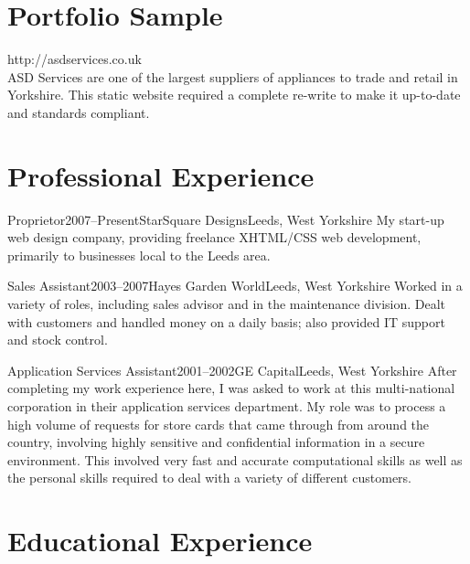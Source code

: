 \documentclass{cv}
\begin{document}
\section{Portfolio Sample}

\begin{description}[style=nextline]
\item[ASD Services] http://asdservices.co.uk\\
ASD Services are one of the largest suppliers of appliances to trade and retail in Yorkshire. This static website required a complete re-write to make it up-to-date and standards compliant.
\end{description}

\section{Professional Experience}

\begin{experience}{Proprietor}{2007--Present}{StarSquare Designs}{Leeds, West Yorkshire}
My start-up web design company, providing freelance XHTML/CSS web development, primarily to businesses local to the Leeds area.
\end{experience}

\begin{experience}{Sales Assistant}{2003--2007}{Hayes Garden World}{Leeds, West Yorkshire}
Worked in a variety of roles, including sales advisor and in the maintenance division. Dealt with customers and handled money on a daily basis; also provided IT support and stock control.
\end{experience}

\begin{experience}{Application Services Assistant}{2001--2002}{GE Capital}{Leeds, West Yorkshire}
After completing my work experience here, I was asked to work at this multi-national corporation in their application services department. My role was to process a high volume of requests for store cards that came through from around the country, involving highly sensitive and confidential information in a secure environment. This involved very fast and accurate computational skills as well as the personal skills required to deal with a variety of different customers.
\end{experience}

\section{Educational Experience}
\end{document}
